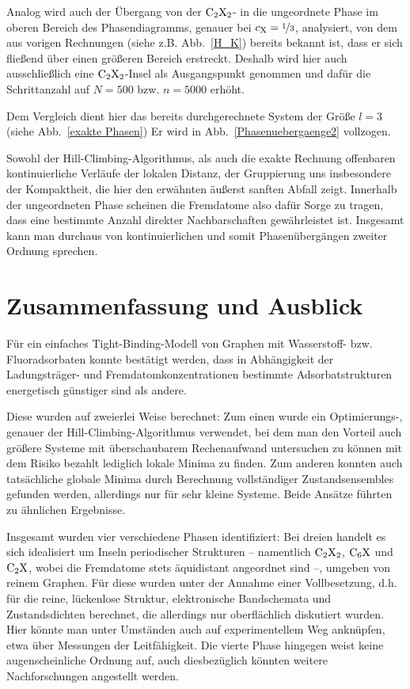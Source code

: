 \documentclass[a4paper, 10pt, twoside, openany]{book} %
\def \cX {c_\mathrm{X}}
\begin{document}
	Analog wird auch der Übergang von der $\rm C_2X_2$- in die ungeordnete Phase im oberen Bereich des Phasendiagramms, genauer bei $\cX = \nicefrac 1 3$, analysiert, von dem aus vorigen Rechnungen (siehe z.B. Abb.~\ref{H_K}) bereits bekannt ist, dass er sich fließend über einen größeren Bereich erstreckt. Deshalb wird hier auch ausschließlich eine $\rm C_2X_2$-Insel als Ausgangspunkt genommen und dafür die Schrittanzahl auf $N = 500$ bzw. $n = 5000$ erhöht.
	
	Dem Vergleich dient hier das bereits durchgerechnete System der Größe $l = 3$ (siehe Abb.~\ref{exakte Phasen}) Er wird in Abb.~\ref{Phasenuebergaenge2} vollzogen.
	
	Sowohl der Hill-Climbing-Algorithmus, als auch die exakte Rechnung offenbaren kontinuierliche Verläufe der lokalen Distanz, der Gruppierung uns insbesondere der Kompaktheit, die hier den erwähnten äußerst sanften Abfall zeigt. Innerhalb der ungeordneten Phase scheinen die Fremdatome also dafür Sorge zu tragen, dass eine bestimmte Anzahl direkter Nachbarschaften gewährleistet ist. Insgesamt kann man durchaus von kontinuierlichen und somit Phasenübergängen zweiter Ordnung sprechen.
	
	\chapter{Zusammenfassung und Ausblick}
	
	Für ein einfaches Tight-Binding-Modell von Graphen mit Wasserstoff- bzw. Fluoradsorbaten konnte bestätigt werden, dass in Abhängigkeit der Ladungsträger- und Fremdatomkonzentrationen bestimmte Adsorbatstrukturen energetisch günstiger sind als andere.
	
	Diese wurden auf zweierlei Weise berechnet: Zum einen wurde ein Optimierungs-, genauer der Hill-Climbing-Algorithmus verwendet, bei dem man den Vorteil auch größere Systeme mit überschaubarem Rechenaufwand untersuchen zu können mit dem Risiko bezahlt lediglich lokale Minima zu finden. Zum anderen konnten auch tatsächliche globale Minima durch Berechnung vollständiger Zustandsensembles gefunden werden, allerdings nur für sehr kleine Systeme. Beide Ansätze führten zu ähnlichen Ergebnisse.
	
	Insgesamt wurden vier verschiedene Phasen identifiziert: Bei dreien handelt es sich idealisiert um Inseln periodischer Strukturen -- namentlich $\rm C_2X_2$, $\rm C_6X$ und $\rm C_2X$, wobei die Fremdatome stets äquidistant angeordnet sind --, umgeben von reinem Graphen. Für diese wurden unter der Annahme einer Vollbesetzung, d.h. für die reine, lückenlose Struktur, elektronische Bandschemata und Zustandsdichten berechnet, die allerdings nur oberflächlich diskutiert wurden. Hier könnte man unter Umständen auch auf experimentellem Weg anknüpfen, etwa über Messungen der Leitfähigkeit. Die vierte Phase hingegen weist keine augenscheinliche Ordnung auf, auch diesbezüglich könnten weitere Nachforschungen angestellt werden.
	
\end{document}
